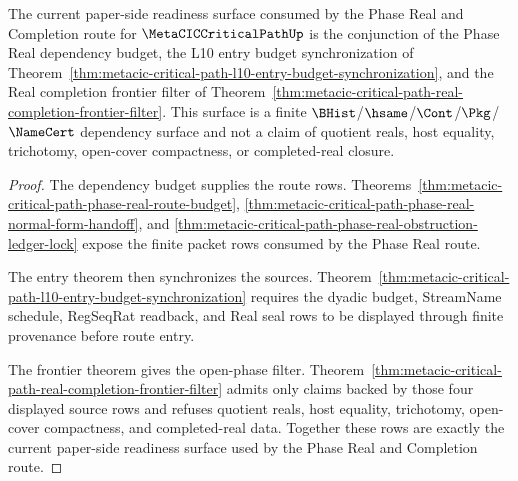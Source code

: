 \begin{theorem}
\label{thm:metacic-critical-path-current-open-phase-readiness}
The current paper-side readiness surface consumed by the Phase Real and Completion route for $\MetaCICCriticalPathUp$ is the conjunction of the Phase Real dependency budget, the L10 entry budget synchronization of Theorem~\ref{thm:metacic-critical-path-l10-entry-budget-synchronization}, and the Real completion frontier filter of Theorem~\ref{thm:metacic-critical-path-real-completion-frontier-filter}. This surface is a finite $\BHist$/$\hsame$/$\Cont$/$\Pkg$/$\NameCert$ dependency surface and not a claim of quotient reals, host equality, trichotomy, open-cover compactness, or completed-real closure.
\end{theorem}
\begin{proof}
The dependency budget supplies the route rows. Theorems~\ref{thm:metacic-critical-path-phase-real-route-budget}, \ref{thm:metacic-critical-path-phase-real-normal-form-handoff}, and \ref{thm:metacic-critical-path-phase-real-obstruction-ledger-lock} expose the finite packet rows consumed by the Phase Real route.

The entry theorem then synchronizes the sources. Theorem~\ref{thm:metacic-critical-path-l10-entry-budget-synchronization} requires the dyadic budget, StreamName schedule, RegSeqRat readback, and Real seal rows to be displayed through finite provenance before route entry.

The frontier theorem gives the open-phase filter. Theorem~\ref{thm:metacic-critical-path-real-completion-frontier-filter} admits only claims backed by those four displayed source rows and refuses quotient reals, host equality, trichotomy, open-cover compactness, and completed-real data. Together these rows are exactly the current paper-side readiness surface used by the Phase Real and Completion route.
\end{proof}

